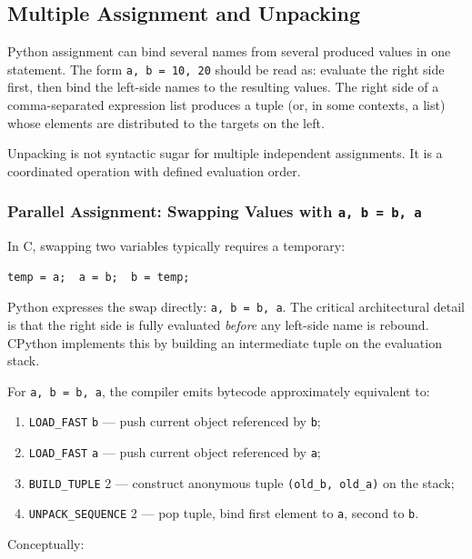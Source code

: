 \subsection{Multiple Assignment and Unpacking}

Python assignment can bind several names from several produced values in one statement. The form \texttt{a, b = 10, 20} should be read as: evaluate the right side first, then bind the left-side names to the resulting values. The right side of a comma-separated expression list produces a tuple (or, in some contexts, a list) whose elements are distributed to the targets on the left.

Unpacking is not syntactic sugar for multiple independent assignments. It is a coordinated operation with defined evaluation order.

\subsubsection{Parallel Assignment: Swapping Values with \texttt{a, b = b, a}}

In C, swapping two variables typically requires a temporary:

\begin{verbatim}
temp = a;  a = b;  b = temp;
\end{verbatim}

Python expresses the swap directly: \texttt{a, b = b, a}. The critical architectural detail is that the right side is fully evaluated \emph{before} any left-side name is rebound. CPython implements this by building an intermediate tuple on the evaluation stack.

For \texttt{a, b = b, a}, the compiler emits bytecode approximately equivalent to:

\begin{enumerate}
    \item \texttt{LOAD\_FAST} \texttt{b} --- push current object referenced by \texttt{b};
    \item \texttt{LOAD\_FAST} \texttt{a} --- push current object referenced by \texttt{a};
    \item \texttt{BUILD\_TUPLE} 2 --- construct anonymous tuple \texttt{(old\_b, old\_a)} on the stack;
    \item \texttt{UNPACK\_SEQUENCE} 2 --- pop tuple, bind first element to \texttt{a}, second to \texttt{b}.
\end{enumerate}

Conceptually:

